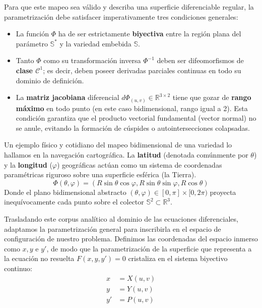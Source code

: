 \documentclass[11pt,a4paper]{article}
\theoremstyle{definition}
\theoremstyle{plain}
\begin{document}
Para que este mapeo sea válido y describa una superficie diferenciable regular, la parametrización debe satisfacer imperativamente tres condiciones generales:
\begin{itemize}
    \item La función $\Phi$ ha de ser estrictamente \textbf{biyectiva} entre la región plana del parámetro $\mathbb{S}^*$ y la variedad embebida $\mathbb{S}$.
    \item Tanto $\Phi$ como su transformación inversa $\Phi^{-1}$ deben ser difeomorfismos de \textbf{clase $\mathcal{C}^1$}; es decir, deben poseer derivadas parciales continuas en todo su dominio de definición.
    \item La \textbf{matriz jacobiana} diferencial $d\Phi_{(u,v)} \in \mathbb{R}^{3\times 2}$ tiene que gozar de \textbf{rango máximo} en todo punto (en este caso bidimensional, rango igual a 2). Esta condición garantiza que el producto vectorial fundamental (vector normal) no se anule, evitando la formación de cúspides o autointersecciones colapsadas.
\end{itemize}

\begin{tcolorbox}[
    enhanced, breakable,
    colback=blue!2!white, colframe=blue!50!black,
    boxrule=0.8pt, arc=4pt, left=12pt, right=12pt, top=10pt, bottom=10pt,
    title=\textbf{Ejemplo analógico: coordenadas geográficas},
    coltitle=white, fonttitle=\bfseries,
    drop fuzzy shadow=gray!15
]
Un ejemplo físico y cotidiano del mapeo bidimensional de una variedad lo hallamos en la navegación cartográfica. La \textbf{latitud} (denotada comúnmente por $\theta$) y la \textbf{longitud} ($\varphi$) geográficas actúan como un sistema de coordenadas paramétricas riguroso sobre una superficie esférica (la Tierra). 
$$ \Phi(\theta, \varphi) = (R\sin\theta\cos\varphi, R\sin\theta\sin\varphi, R\cos\theta) $$
Donde el plano bidimensional abstracto $(\theta, \varphi) \in [0, \pi] \times [0, 2\pi)$ proyecta inequívocamente cada punto sobre el colector $\mathbb{S}^2 \subset \mathbb{R}^3$.
\end{tcolorbox}

Trasladando este corpus analítico al dominio de las ecuaciones diferenciales, adaptamos la parametrización general para inscribirla en el espacio de configuración de nuestro problema. Definimos las coordenadas del espacio inmerso como $x, y$ e $y'$, de modo que la parametrización de la superficie que representa a la ecuación no resuelta $F(x,y,y') = 0$ cristaliza en el sistema biyectivo continuo:
\begin{align*}
    x &= X(u,v) \\
    y &= Y(u,v) \\
    y' &= P(u,v)
\end{align*}
\end{document}
